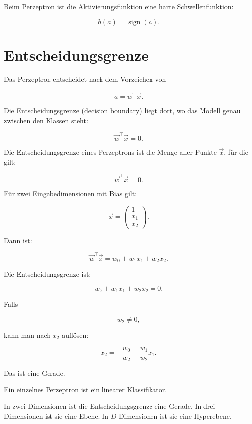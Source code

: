 Beim Perzeptron ist die Aktivierungsfunktion eine harte Schwellenfunktion:

\[
    h(a)
    =
    \operatorname{sign}(a).
\]

\section{Entscheidungsgrenze}

Das Perzeptron entscheidet nach dem Vorzeichen von

\[
    a
    =
    \vec{w}^{\top}\vec{x}.
\]

Die Entscheidungsgrenze (decision boundary) liegt dort, wo das Modell genau zwischen den Klassen steht:

\[
    \vec{w}^{\top}\vec{x}=0.
\]

\begin{definitionbox}
Die Entscheidungsgrenze eines Perzeptrons ist die Menge aller Punkte \(\vec{x}\), für die gilt:

\[
    \vec{w}^{\top}\vec{x}=0.
\]
\end{definitionbox}

Für zwei Eingabedimensionen mit Bias gilt:

\[
    \vec{x}
    =
    \begin{pmatrix}
        1 \\
        x_1 \\
        x_2
    \end{pmatrix}.
\]

Dann ist:

\[
    \vec{w}^{\top}\vec{x}
    =
    w_0+w_1x_1+w_2x_2.
\]

Die Entscheidungsgrenze ist:

\[
    w_0+w_1x_1+w_2x_2=0.
\]

Falls

\[
    w_2 \neq 0,
\]

kann man nach \(x_2\) auflösen:

\[
    x_2
    =
    -\frac{w_0}{w_2}
    -
    \frac{w_1}{w_2}x_1.
\]

Das ist eine Gerade.

\begin{conceptbox}
Ein einzelnes Perzeptron ist ein linearer Klassifikator.

In zwei Dimensionen ist die Entscheidungsgrenze eine Gerade.
In drei Dimensionen ist sie eine Ebene.
In \(D\) Dimensionen ist sie eine Hyperebene.
\end{conceptbox}

